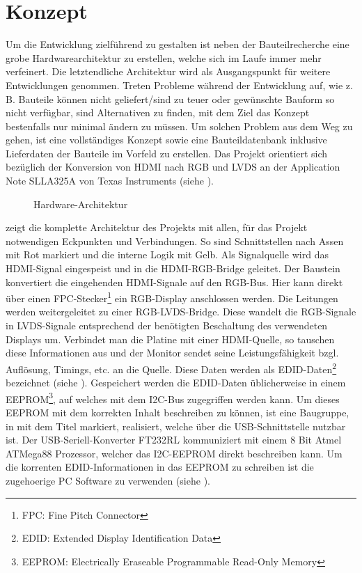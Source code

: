 \section{Konzept}
\label{sec:TeilB_Konzept}
Um die Entwicklung zielführend zu gestalten ist neben der Bauteilrecherche eine grobe Hardwarearchitektur zu erstellen, welche sich im Laufe immer mehr verfeinert. Die letztendliche Architektur wird als Ausgangspunkt für weitere Entwicklungen genommen. Treten Probleme während der Entwicklung auf, wie z. B. Bauteile können nicht geliefert/sind zu teuer oder gewünschte Bauform so nicht verfügbar, sind Alternativen zu finden, mit dem Ziel das Konzept bestenfalls nur minimal ändern zu müssen. Um solchen Problem aus dem Weg zu gehen, ist eine vollständiges Konzept sowie eine Bauteildatenbank inklusive Lieferdaten der Bauteile im Vorfeld zu erstellen. Das Projekt orientiert sich bezüglich der Konversion von HDMI nach RGB und LVDS an der Application Note SLLA325A von Texas Instruments (siehe \cite{TI2011}).
\begin{figure}[htp]
	\centering
{}
	\caption{Hardware-Architektur}
	\label{fig:teilb_architektur}
\end{figure}

 zeigt die komplette Architektur des Projekts mit allen, für das Projekt notwendigen Eckpunkten und Verbindungen. So sind Schnittstellen nach Assen mit Rot markiert und die interne Logik mit Gelb. Als Signalquelle wird das HDMI-Signal eingespeist und in die HDMI-RGB-Bridge geleitet. Der Baustein  konvertiert die eingehenden HDMI-Signale auf den RGB-Bus. Hier kann direkt über einen FPC-Stecker\footnote{FPC: Fine Pitch Connector} ein RGB-Display anschlossen werden. Die Leitungen werden weitergeleitet zu einer RGB-LVDS-Bridge. Diese wandelt die RGB-Signale in LVDS-Signale entsprechend der benötigten Beschaltung des verwendeten Displays um. Verbindet man die Platine mit einer HDMI-Quelle, so tauschen diese Informationen aus und der Monitor sendet seine Leistungsfähigkeit bzgl. Auflösung, Timings, etc. an die Quelle. Diese Daten werden als EDID-Daten\footnote{EDID: Extended Display Identification Data} bezeichnet (siehe ). Gespeichert werden die EDID-Daten üblicherweise in einem EEPROM\footnote{EEPROM: Electrically Eraseable Programmable Read-Only Memory}, auf welches mit dem I2C-Bus zugegriffen werden kann. Um dieses EEPROM mit dem korrekten Inhalt beschreiben zu können, ist eine Baugruppe, in  mit dem Titel  markiert, realisiert, welche über die USB-Schnittstelle nutzbar ist. Der USB-Seriell-Konverter FT232RL kommuniziert mit einem 8 Bit Atmel ATMega88 Prozessor, welcher das I2C-EEPROM direkt beschreiben kann. Um die korrenten EDID-Informationen in das EEPROM zu schreiben ist die zugehoerige PC Software zu verwenden (siehe ).\newpage
